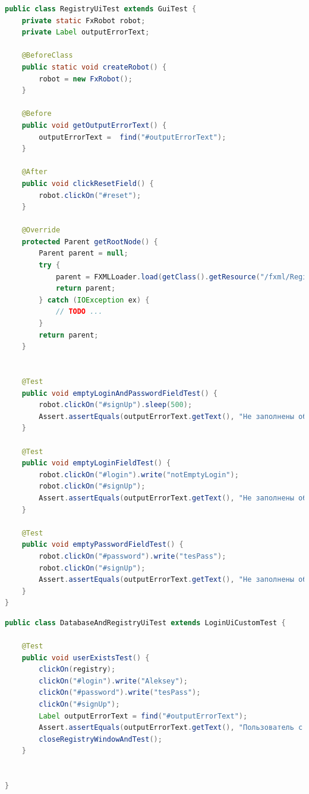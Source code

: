 \documentclass[a4paper,12pt]{article}
\begin{document}
\begin{lstlisting}[language=java, caption=тестирование не заполнения полей при регистрации, label=listing:testNullFields]
public class RegistryUiTest extends GuiTest {
    private static FxRobot robot;
    private Label outputErrorText;

    @BeforeClass
    public static void createRobot() {
        robot = new FxRobot();
    }

    @Before
    public void getOutputErrorText() {
        outputErrorText =  find("#outputErrorText");
    }

    @After
    public void clickResetField() {
        robot.clickOn("#reset");
    }

    @Override
    protected Parent getRootNode() {
        Parent parent = null;
        try {
            parent = FXMLLoader.load(getClass().getResource("/fxml/Registry.fxml"));
            return parent;
        } catch (IOException ex) {
            // TODO ...
        }
        return parent;
    }


    @Test
    public void emptyLoginAndPasswordFieldTest() {
        robot.clickOn("#signUp").sleep(500);
        Assert.assertEquals(outputErrorText.getText(), "Не заполнены обязательные поля: Логин; Пароль; ");
    }

    @Test
    public void emptyLoginFieldTest() {
        robot.clickOn("#login").write("notEmptyLogin");
        robot.clickOn("#signUp");
        Assert.assertEquals(outputErrorText.getText(), "Не заполнены обязательные поля: Пароль; ");
    }

    @Test
    public void emptyPasswordFieldTest() {
        robot.clickOn("#password").write("tesPass");
        robot.clickOn("#signUp");
        Assert.assertEquals(outputErrorText.getText(), "Не заполнены обязательные поля: Логин; ");
    }
}

\end{lstlisting}

\begin{lstlisting}[language=java, caption=тестирование попытки регистрации существующего пользователя, label=listing:testRegExistUser]
public class DatabaseAndRegistryUiTest extends LoginUiCustomTest {

    @Test
    public void userExistsTest() {
        clickOn(registry);
        clickOn("#login").write("Aleksey");
        clickOn("#password").write("tesPass");
        clickOn("#signUp");
        Label outputErrorText = find("#outputErrorText");
        Assert.assertEquals(outputErrorText.getText(), "Пользователь с логином: Aleksey существует!");
        closeRegistryWindowAndTest();
    }


}

\end{lstlisting}
\end{document}
